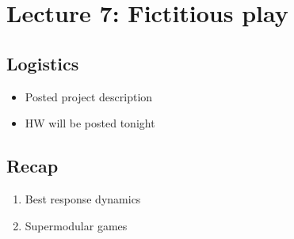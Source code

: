 \section{Lecture 7: Fictitious play}
\newsection
\subsection*{Logistics}
\begin{itemize}
    \item Posted project description
    \item HW will be posted tonight
\end{itemize}
\subsection*{Recap}
\begin{enumerate}
    \item Best response dynamics
    \item Supermodular games 
\end{enumerate}

